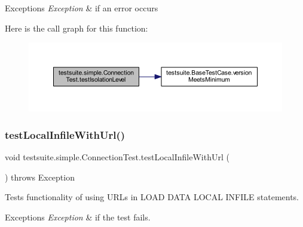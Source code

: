 \begin{DoxyExceptions}{Exceptions}
{\em Exception} & if an error occurs \\
\hline
\end{DoxyExceptions}
Here is the call graph for this function\+:
\nopagebreak
\begin{figure}[H]
\begin{center}
\leavevmode
\includegraphics[width=350pt]{classtestsuite_1_1simple_1_1_connection_test_a021e6d2e50117ac6af546f9f340e2127_cgraph}
\end{center}
\end{figure}
\mbox{\label{classtestsuite_1_1simple_1_1_connection_test_aeb62fe06a5c144213319846e29ad17f5}} 
\subsubsection{\texorpdfstring{test\+Local\+Infile\+With\+Url()}{testLocalInfileWithUrl()}}
{\footnotesize\ttfamily void testsuite.\+simple.\+Connection\+Test.\+test\+Local\+Infile\+With\+Url (\begin{DoxyParamCaption}{ }\end{DoxyParamCaption}) throws Exception}

Tests functionality of using U\+R\+Ls in \textquotesingle{}L\+O\+AD D\+A\+TA L\+O\+C\+AL I\+N\+F\+I\+LE\textquotesingle{} statements.


\begin{DoxyExceptions}{Exceptions}
{\em Exception} & if the test fails. \\
\hline
\end{DoxyExceptions}
\mbox{\label{classtestsuite_1_1simple_1_1_connection_test_af716a61440ab4bf588f5160f6ca5aafb}} 
